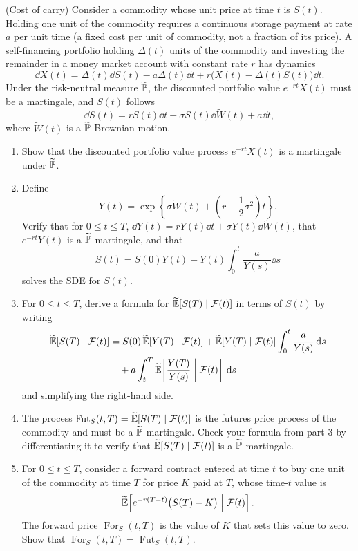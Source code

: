 \begin{problem}
    (Cost of carry) Consider a commodity whose unit price at time $t$ is $S(t)$. Holding one unit of the commodity requires a continuous storage payment at rate $a$ per unit time (a fixed cost per unit of commodity, not a fraction of its price). A self-financing portfolio holding $\Delta(t)$ units of the commodity and investing the remainder in a money market account with constant rate $r$ has dynamics
    \[
    \dd X(t) = \Delta(t)\dd S(t) - a\Delta(t)\dd t + r\bigl(X(t) - \Delta(t)S(t)\bigr)\dd t.
    \]
    Under the risk-neutral measure $\widetilde{\mathbb{P}}$, the discounted portfolio value $e^{-rt} X(t)$ must be a martingale, and $S(t)$ follows
    \[
    \dd S(t) = r S(t)\dd t + \sigma S(t)\dd\widetilde{W}(t) + a\dd t,
    \]
    where $\widetilde{W}(t)$ is a $\widetilde{\mathbb{P}}$-Brownian motion.
    \begin{enumerate}
        \item Show that the discounted portfolio value process $e^{-rt} X(t)$ is a martingale under $\widetilde{\mathbb{P}}$.
        \item Define
        \[
        Y(t) = \exp\!\left\{\sigma\widetilde{W}(t) + \left(r - \frac{1}{2}\sigma^2\right)t\right\}.
        \]
        Verify that for $0 \leq t \leq T$, $\dd Y(t) = r Y(t)\dd t + \sigma Y(t)\dd\widetilde{W}(t)$, that $e^{-rt} Y(t)$ is a $\widetilde{\mathbb{P}}$-martingale, and that
        \[
        S(t) = S(0) Y(t) + Y(t) \int_0^t \frac{a}{Y(s)}\dd s
        \]
        solves the SDE for $S(t)$.
        \item For $0 \leq t \leq T$, derive a formula for $\widetilde{\mathbb{E}}[S(T) \mid \mathcal{F}(t)]$ in terms of $S(t)$ by writing
        \begin{align*}
        \widetilde{\mathbb{E}}[S(T) \mid \mathcal{F}(t)] &= S(0)\,\widetilde{\mathbb{E}}[Y(T) \mid \mathcal{F}(t)] + \widetilde{\mathbb{E}}[Y(T) \mid \mathcal{F}(t)] \int_0^t \frac{a}{Y(s)}\,\mathrm{d} s \\
        &\quad + a \int_t^T \widetilde{\mathbb{E}}\!\left[\frac{Y(T)}{Y(s)} \;\middle|\; \mathcal{F}(t)\right]\,\mathrm{d} s
        \end{align*}
        and simplifying the right-hand side.
        \item The process $\operatorname{Fut}_S(t, T) = \widetilde{\mathbb{E}}[S(T) \mid \mathcal{F}(t)]$ is the futures price process of the commodity and must be a $\widetilde{\mathbb{P}}$-martingale. Check your formula from part 3 by differentiating it to verify that $\widetilde{\mathbb{E}}[S(T) \mid \mathcal{F}(t)]$ is a $\widetilde{\mathbb{P}}$-martingale.
        \item For $0 \leq t \leq T$, consider a forward contract entered at time $t$ to buy one unit of the commodity at time $T$ for price $K$ paid at $T$, whose time-$t$ value is
        \[
        \widetilde{\mathbb{E}}\!\left[e^{-r(T-t)}\bigl(S(T) - K\bigr) \;\middle|\; \mathcal{F}(t)\right].
        \]
        The forward price $\operatorname{For}_S(t, T)$ is the value of $K$ that sets this value to zero. Show that $\operatorname{For}_S(t, T) = \operatorname{Fut}_S(t, T)$.
    \end{enumerate}
\end{problem}

